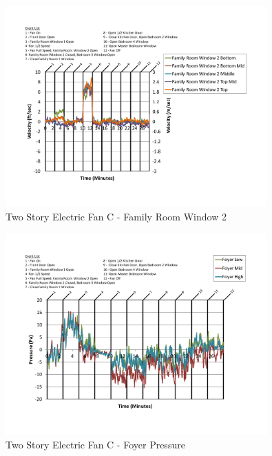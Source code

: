 \documentclass{article}
\begin{document}
\begin{appendices}
	\begin{figure}[H]
		\centering
		\includegraphics[height=3.05in,trim=0.67in 1.1in 0.67in 0.8in,clip=true]{0_Images/Results_Charts/ColdFlow/Two_Story/Electric/C/Family_Room_Window_2.pdf}
		\caption{Two Story Electric Fan C - Family Room Window 2}
	\end{figure}
 

	\begin{figure}[H]
		\centering
		\includegraphics[height=3.05in,trim=0.67in 1.1in 0.67in 0.8in,clip=true]{0_Images/Results_Charts/ColdFlow/Two_Story/Electric/C/Foyer_Pressure.pdf}
		\caption{Two Story Electric Fan C - Foyer Pressure}
	\end{figure}
 
	\clearpage


\end{appendices}
\end{document}

